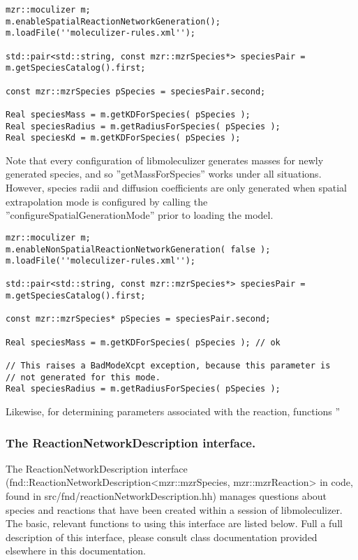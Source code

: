 \lstset{language=C++}
\begin{lstlisting}[caption=Finding spatial properties of a species
  using moleculizer]
mzr::moculizer m;
m.enableSpatialReactionNetworkGeneration();
m.loadFile(''moleculizer-rules.xml'');

std::pair<std::string, const mzr::mzrSpecies*> speciesPair =
m.getSpeciesCatalog().first;

const mzr::mzrSpecies pSpecies = speciesPair.second;

Real speciesMass = m.getKDForSpecies( pSpecies );
Real speciesRadius = m.getRadiusForSpecies( pSpecies );
Real speciesKd = m.getKDForSpecies( pSpecies );
\end{lstlisting}

Note that every configuration of libmoleculizer generates masses for
newly generated species, and so ''getMassForSpecies'' works under all
situations.  However, species radii and diffusion coefficients are
only generated when spatial extrapolation mode is configured by
calling the ''configureSpatialGenerationMode'' prior to loading the
model.  

\begin{lstlisting}[caption=Finding out information about species in
  non-spatial mode]
mzr::moculizer m;
m.enableNonSpatialReactionNetworkGeneration( false );
m.loadFile(''moleculizer-rules.xml'');

std::pair<std::string, const mzr::mzrSpecies*> speciesPair =
m.getSpeciesCatalog().first;

const mzr::mzrSpecies* pSpecies = speciesPair.second;

Real speciesMass = m.getKDForSpecies( pSpecies ); // ok

// This raises a BadModeXcpt exception, because this parameter is 
// not generated for this mode.
Real speciesRadius = m.getRadiusForSpecies( pSpecies ); 
\end{lstlisting}

Likewise, for determining parameters associated with the reaction,
functions ''



\subsubsection{The ReactionNetworkDescription interface.}
The ReactionNetworkDescription interface
(fnd::ReactionNetworkDescription<mzr::mzrSpecies, mzr::mzrReaction> in
code, found in src/fnd/reactionNetworkDescription.hh) manages questions
about species and reactions that have been created within a session of
libmoleculizer.  The basic, relevant functions to using this interface
are listed below.  Full a full description of this interface, please
consult class documentation provided elsewhere in this documentation.

